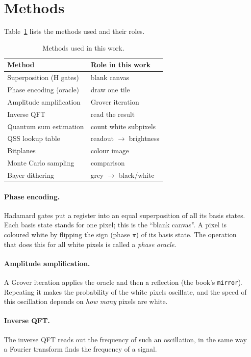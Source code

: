 \documentclass[10pt,twocolumn,a4paper]{article}
\begin{document}
\section{Methods}\label{sec:methods}

Table~\ref{tab:methods} lists the methods used and their roles.

\begin{table}[t]
\centering\small
\caption{Methods used in this work.}
\label{tab:methods}
\begin{tabular}{ll}
\toprule
Method & Role in this work\\
\midrule
Superposition (H gates) & blank canvas\\
Phase encoding (oracle) & draw one tile\\
Amplitude amplification & Grover iteration\\
Inverse QFT & read the result\\
Quantum sum estimation & count white subpixels\\
QSS lookup table & readout $\to$ brightness\\
Bitplanes & colour image\\
Monte Carlo sampling & comparison\\
Bayer dithering & grey $\to$ black/white\\
\bottomrule
\end{tabular}
\end{table}

\paragraph{Phase encoding.}
Hadamard gates put a register into an equal superposition of all its basis
states. Each basis state stands for one pixel; this is the ``blank canvas''.
A pixel is coloured white by flipping the sign (phase $\pi$) of its basis state.
The operation that does this for all white pixels is called a \emph{phase
oracle}.

\paragraph{Amplitude amplification.}
A Grover iteration applies the oracle and then a reflection (the book's
\texttt{mirror}). Repeating it makes the probability of the white pixels
oscillate, and the speed of this oscillation depends on \emph{how many} pixels
are white.

\paragraph{Inverse QFT.}
The inverse QFT reads out the frequency of such an oscillation, in the same way
a Fourier transform finds the frequency of a signal.
\end{document}
